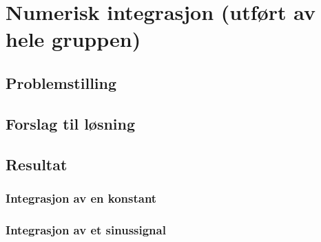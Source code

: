 
\chapter{Numerisk integrasjon  
  (utført av hele gruppen) }\label{kap:prosjekt01}



\section{Problemstilling}

\section{Forslag til løsning}

\section{Resultat}
\subsection{Integrasjon av en konstant}

\subsection{Integrasjon av et sinussignal}



